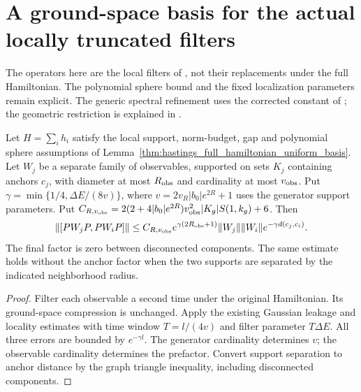 \section{A ground-space basis for the actual locally truncated filters}

The operators here are the local filters of \cite{Hastings2006Solving},
not their replacements under the full Hamiltonian. The polynomial sphere
bound and the fixed localization parameters remain explicit. The generic
spectral refinement uses the corrected constant of
\cite{gap:hastings05_basis_refinement}; the geometric restriction is
explained in \cite{gap:hastings05_two_dim_ground_basis}.

\begin{lemma}
    \label{lem:hastings_separate_observable_compressed_decay}
    \leanok
    Let $H=\sum_i h_i$ satisfy the local support, norm-budget, gap and
    polynomial sphere assumptions of
    Lemma~\ref{thm:hastings_full_hamiltonian_uniform_basis}.
    Let $W_j$ be a separate family of observables, supported on sets $K_j$
    containing anchors $c_j$, with diameter at most $R_{\rm obs}$ and
    cardinality at most $v_{\rm obs}$. Put
    $\gamma=\min\{1/4,\Delta E/(8v)\}$, where
    $v=2v_R|b_0|e^{2R}+1$ uses the generator support parameters.
    Put $C_{R,v_{\rm obs}}=2(2+4|b_0|e^{2R})v_{\rm obs}^2|K_g|S(1,k_g)+6$.
    Then
    \[
      \|[PW_jP,PW_iP]\|
      \le C_{R,v_{\rm obs}}e^{\gamma(2R_{\rm obs}+1)}
        \|W_j\|\|W_i\| e^{-\gamma d(c_j,c_i)}.
    \]
    The final factor is zero between disconnected components. The same
    estimate holds without the anchor factor when the two supports are
    separated by the indicated neighborhood radius.
\end{lemma}
\begin{proof}\leanok
    Filter each observable a second time under the original Hamiltonian.
    Its ground-space compression is unchanged. Apply the existing Gaussian
    leakage and locality estimates with time window $T=l/(4v)$ and filter
    parameter $T\Delta E$. All three errors are bounded by $e^{-\gamma l}$.
    The generator cardinality determines $v$; the observable cardinality
    determines the prefactor. Convert support separation to anchor distance
    by the graph triangle inequality, including disconnected components.
\end{proof}

